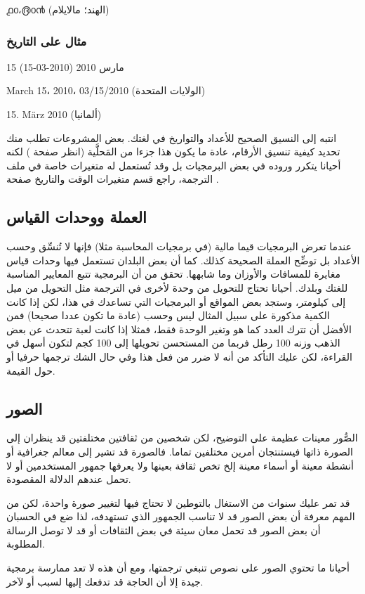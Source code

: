 ൧൦،൫൦൯ (الهند؛ مالايلام)

\subsubsection{مثال على التاريخ}
15 مارس 2010 (2010-03-15)

March 15، 2010، 03/15/2010 (الولايات المتحدة)

15. März 2010 (ألمانيا)

انتبه إلى النسيق الصحيح للأعداد والتواريخ في لغتك. بعض المشروعات تطلب
منك تحديد كيفية تنسيق الأرقام، عادة ما يكون هذا جزءا من المَحلَّية
(انظر صفحة \at[ref:34561726]) لكنه أحيانا يتكرر وروده في بعض
البرمجيات بل وقد تُستعمل له متغيرات خاصة في ملف الترجمة، راجع قسم
متغيرات الوقت والتاريخ صفحة \at[ref:43524426].

\subsection{العملة ووحدات القياس}
عندما تعرض البرمجيات قيما مالية (في برمجيات المحاسبة مثلا) فإنها لا
تُنسِّق وحسب الأعداد بل توضِّح العملة الصحيحة كذلك. كما أن بعض البلدان
تستعمل فيها وحدات قياس مغايرة للمسافات والأوزان وما شابهها. تحقق من أن
البرمجية تتبع المعايير المناسبة للغتك وبلدك. أحيانا تحتاج للتحويل من
وحدة لأخرى في الترجمة مثل التحويل من ميل إلى كيلومتر، وستجد بعض المواقع
أو البرمجيات التي تساعدك في هذا، لكن إذا كانت الكمية مذكورة على سبيل
المثال ليس وحسب (عادة ما تكون عددا صحيحا) فمن الأفضل أن تترك العدد كما
هو وتغير الوحدة فقط، فمثلا إذا كانت لعبة تتحدث عن بعض الذهب وزنه 100
رطل فربما من المستحسن تحويلها إلى 100 كجم لتكون أسهل في القراءة، لكن
عليك التأكد من أنه لا ضرر من فعل هذا وفي حال الشك ترجمها حرفيا أو حول
القيمة.

\subsection{الصور}
الصُّور معينات عظيمة على التوضيح، لكن شخصين من ثقافتين مختلفتين قد
ينظران إلى الصورة ذاتها فيستنتجان أمرين مختلفين تماما. فالصورة قد تشير
إلى معالم جغرافية أو أنشطة معينة أو أسماء معينة إلخ تخص ثقافة بعينها
ولا يعرفها جمهور المستخدمين أو لا تحمل عندهم الدلالة المقصودة.

قد تمر عليك سنوات من الاستغال بالتوطين لا تحتاج فيها لتغيير صورة واحدة،
لكن من المهم معرفة أن بعض الصور قد لا تناسب الجمهور الذي تستهدفه، لذا
ضع في الحسبان أن بعض الصور قد تحمل معان سيئة في بعض الثقافات أو قد لا
توصل الرسالة المطلوبة.

أحيانا ما تحتوي الصور على نصوص تنبغي ترجمتها، ومع أن هذه لا تعد ممارسة
برمجية جيدة إلا أن الحاجة قد تدفعك إليها لسبب أو لآخر.

